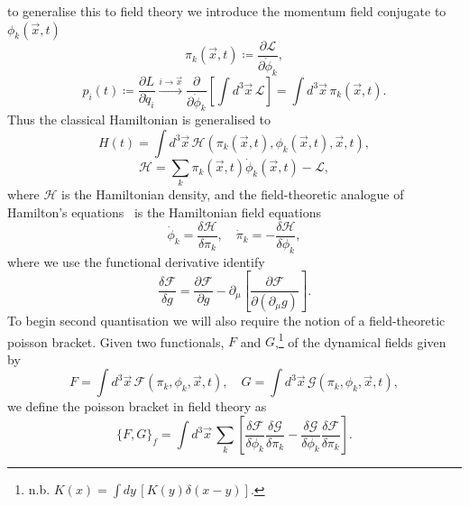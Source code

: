 \documentclass[11pt, a4paper]{article}
\begin{document}
to generalise this to field theory we introduce the momentum field conjugate to 
$\phi_k(\vec{x}, t)$
\begin{equation}
  \pi_k(\vec{x}, t) \coloneq \frac{\partial \mathcal{L} }{\partial \dot{\phi}_k},
\end{equation}
\begin{equation}
  p_i(t) \coloneq \frac{\partial L}{\partial \dot{q}_i} \xrightarrow{i \rightarrow \vec{x}}
  \frac{\partial}{\partial \dot{\phi}_k} \left[ \int{d^3\vec{x}\,\mathcal{L}} \right]
  = \int{d^3\vec{x}\,\pi_k(\vec{x}, t)}.
\end{equation}
Thus the classical Hamiltonian is generalised to
\begin{equation}
  H(t) = \int{d^3\vec{x}\,\mathcal{H}(\pi_k(\vec{x}, t), \phi_k(\vec{x}, t), \vec{x}, t) },
\end{equation}
\begin{equation}
  \mathcal{H} = \sum_{k}{\pi_k(\vec{x}, t)\dot{\phi}_k(\vec{x}, t) - \mathcal{L}},
\end{equation}
where $\mathcal{H}$ is the Hamiltonian density, and the field-theoretic 
analogue of Hamilton's equations~\cite{LA&LI-Mech-VII} is
the Hamiltonian field equations~\cite{ClassField}
\begin{equation}
  \dot{\phi}_k = \frac{\delta \mathcal{H}}{\delta \pi_k}, \quad
  \dot{\pi}_k = - \frac{\delta \mathcal{H}}{\delta \phi_k},
\end{equation}
where we use the functional derivative identify 
\begin{equation}
  \frac{\delta \mathcal{F}}{\delta g} = \frac{\partial \mathcal{F}}{\partial g}
  - \partial_\mu \left[ \frac{\partial \mathcal{F}}{\partial (\partial_\mu g)} \right].
\end{equation}
To begin second quantisation we will also require the notion of a field-theoretic poisson bracket.
Given two functionals, $F$ and $G$,\footnote{n.b. $K({x}) = \int{d{y}\,[K({y}) \delta(x - y)]}$.}
of the dynamical fields given by 
\begin{equation}
  F = \int{d^3\vec{x}\, \mathcal{F}(\pi_k, \phi_k, \vec{x}, t)}, \quad
  G = \int{d^3\vec{x}\, \mathcal{G}(\pi_k, \phi_k, \vec{x}, t)},
\end{equation}
we define the poisson bracket in field theory as
\begin{equation}
  {\{F, G \}}_{f} = \int{d^3\vec{x}\,
  \sum_{k}{\left[ \frac{\delta \mathcal{F}}{\delta \phi_k}\frac{\delta \mathcal{G}}{\delta \pi_k} 
- \frac{\delta \mathcal{G}}{\delta \phi_k}\frac{\delta \mathcal{F}}{\delta \pi_k} \right]}  }.
\end{equation}
 
\end{document}
